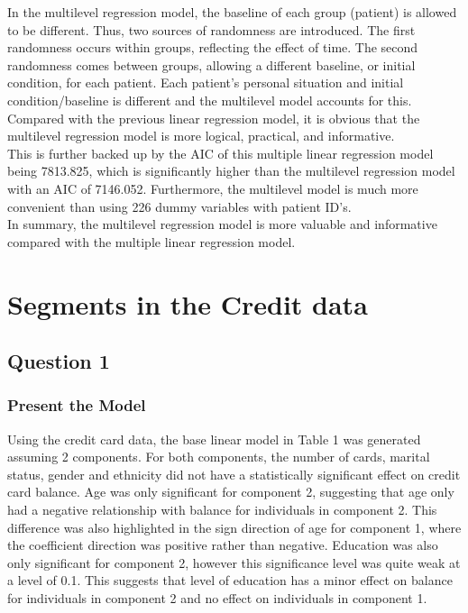 \documentclass[12pt]{article}
\begin{document}
{In the multilevel regression model, the baseline of each group (patient) is allowed to be different. Thus, two sources of randomness are introduced. The first randomness occurs within groups, reflecting the effect of time. The second randomness comes between groups, allowing a different baseline, or initial condition, for each patient. Each patient’s personal situation and initial condition/baseline is different and the multilevel model accounts for this. Compared with the previous linear regression model, it is obvious that the multilevel regression model is more logical, practical, and informative.\\

This is further backed up by the AIC of this multiple linear regression model being 7813.825, which is significantly higher than the multilevel regression model with an AIC of 7146.052. Furthermore, the multilevel model is much more convenient than using 226 dummy variables with patient ID's.\\

In summary, the multilevel regression model is more valuable and informative compared with the multiple linear regression model.\\

\section*{Segments in the Credit data}
\subsection*{Question 1}
\subsubsection*{Present the Model}
Using the credit card data, the base linear model in Table 1 was generated assuming 2 components. For both components, the number of cards, marital status, gender and ethnicity did not have a statistically significant effect on credit card balance. Age was only significant for component 2, suggesting that age only had a negative relationship with balance for individuals in component 2. This difference was also highlighted in the sign direction of age for component 1, where the coefficient direction was positive rather than negative. Education was also only significant for component 2, however this significance level was quite weak at a level of 0.1. This suggests that level of education has a minor effect on balance for individuals in component 2 and no effect on individuals in component 1.\\

}
\end{document}
